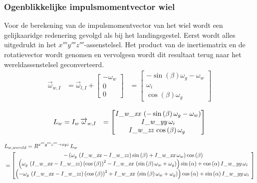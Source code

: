 \subsubsection{Ogenblikkelijke impulsmomentvector wiel}
Voor de berekening van de impulsmomentvector van het wiel wordt een gelijkaaridge redenering gevolgd als bij het landingsgestel. Eerst wordt alles uitgedrukt in het $x'''y'''z'''$-assenstelsel. Het product van de inertiematrix en de rotatievector wordt genomen en vervolgesn wordt dit resultaat terug naar het wereldassenstelsel geconverteerd.
\begin{equation*}
\begin{split}
\overrightarrow{\omega}_{w,I}
&=\overrightarrow{\omega}_{l,I}+
\begin{bmatrix}
-\omega_{w}\\
0\\
0\
\end{bmatrix}
&=\begin{bmatrix}
-\sin \left( \beta \right) \omega_{g}-\omega
_{w}\\
\omega_{i}\\
\cos \left( 
\beta \right) \omega_{g}\
\end{bmatrix}
\end{split}
\end{equation*}

\begin{equation*}
\begin{split}
L_{w}&=I_{w}\,\overrightarrow{\omega}_{w,I}&=
\begin{bmatrix}
{\it I\_w\_xx}\, \left( -\sin \left( \beta
 \right) \omega_{g}-\omega_{w} \right) \\
{\it 
I\_w\_yy}\,\omega_{i}\\
{\it I\_w\_zz}\,\cos \left( 
\beta \right) \omega_{g}\
\end{bmatrix}
\end{split}
\end{equation*}

\begin{align*}
&L_{w,wereld}=R^{x'''y'''z''' \rightarrow xyz}\,L_{w}\\
&=\begin{bmatrix}
- \left( \omega_{g}\, \left( {\it I\_w\_xx}-
{\it I\_w\_zz} \right) \sin \left( \beta \right) +{\it I\_w\_xx}\,
\omega_{w} \right) \cos \left( \beta \right) \\ 
%
 \left( \omega_{g}\, \left( {\it I\_w\_xx}-{\it I\_w\_zz} \right) 
 \left( \cos \left( \beta \right)  \right) ^{2}-{\it I\_w\_xx}\,
 \left( \sin \left( \beta \right) \omega_{w}+\omega_{g} \right) 
 \right) \sin \left( \alpha \right) +\cos \left( \alpha \right) {\it 
I\_w\_yy}\,\omega_{i}\\ 
%
 \left( -\omega_{g}\,
 \left( {\it I\_w\_xx}-{\it I\_w\_zz} \right)  \left( \cos \left( 
\beta \right)  \right) ^{2}+{\it I\_w\_xx}\, \left( \sin \left( \beta
 \right) \omega_{w}+\omega_{g} \right)  \right) \cos \left( \alpha
 \right) +\sin \left( \alpha \right) {\it I\_w\_yy}\,\omega_{i}
\
\end{bmatrix}
\end{align*}

